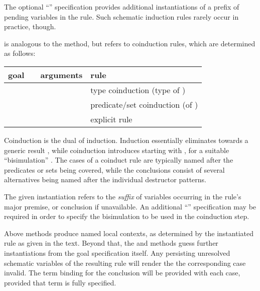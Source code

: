 \begin{isabellebody}
\begin{isamarkuptext}
\begin{descr}
  The optional ``''
  specification provides additional instantiations of a prefix of
  pending variables in the rule.  Such schematic induction rules
  rarely occur in practice, though.

  \item [\mbox{\isa{coinduct}}~\isa{inst\ R}] is analogous to the
  \mbox{} method, but refers to coinduction rules, which are
  determined as follows:

  \medskip
  \begin{tabular}{llll}
    goal          &                    & arguments & rule \\\hline
                  & \mbox{\isa{coinduct}} & \isa{x} & type coinduction (type of \isa{x}) \\
    \isa{A\ x} & \mbox{\isa{coinduct}} & \isa{{\isasymdots}} & predicate/set coinduction (of \isa{A}) \\
    \isa{{\isasymdots}}   & \mbox{\isa{coinduct}} & \isa{{\isasymdots}\ rule{\isacharcolon}\ R} & explicit rule \isa{R} \\
  \end{tabular}
  
  Coinduction is the dual of induction.  Induction essentially
  eliminates  towards a generic result ,
  while coinduction introduces  starting with , for a suitable ``bisimulation'' .  The cases of a
  coinduct rule are typically named after the predicates or sets being
  covered, while the conclusions consist of several alternatives being
  named after the individual destructor patterns.
  
  The given instantiation refers to the \emph{suffix} of variables
  occurring in the rule's major premise, or conclusion if unavailable.
  An additional ``''
  specification may be required in order to specify the bisimulation
  to be used in the coinduction step.

  \end{descr}

  Above methods produce named local contexts, as determined by the
  instantiated rule as given in the text.  Beyond that, the \mbox{} and \mbox{} methods guess further instantiations
  from the goal specification itself.  Any persisting unresolved
  schematic variables of the resulting rule will render the the
  corresponding case invalid.  The term binding \mbox{} for
  the conclusion will be provided with each case, provided that term
  is fully specified.


\end{isamarkuptext}
\end{isabellebody}
